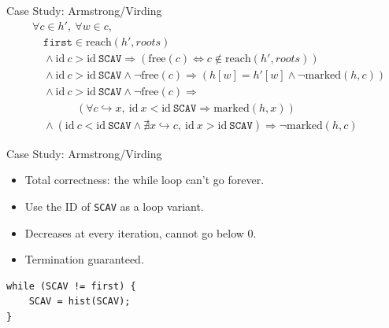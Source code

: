 \documentclass[usenames,dvipsnames]{beamer}
\renewcommand{\iff}{\Leftrightarrow}
\renewcommand{\implies}{\Rightarrow}
\newcommand{\pointsto}{\hookrightarrow}
\newcommand{\reach}[2]{\mathrm{reach}\left(#1, #2\right)}
\newcommand{\id}{\mathrm{id}}
\newcommand{\free}[1]{\mathrm{free}\left(#1\right)}
\newcommand{\marked}[2]{\mathrm{marked}\left(#1, #2\right)}
\begin{document}
\begin{frame}[fragile]{Case Study: Armstrong/Virding}
  \begin{align*}
    &\forall c \in h',\ \forall w \in c,\\
    &\quad\mathtt{first} \in\reach{h'}{roots}\\
%
    &\quad\land \id~c > \id~\mathtt{SCAV} \implies (\free{c}
      \iff c \notin \reach{h'}{roots})\\
%
    &\quad\land \id~c > \id~\mathtt{SCAV} \land \lnot\free{c}
      \implies (h[w] = h'[w] \land \lnot \marked{h}{c})\\
%
    &\quad\land \id~c > \id~\mathtt{SCAV} \land \lnot\free{c}
      \implies\\
      &\quad\quad\quad\quad(\forall c \pointsto x,\ \id~x <
      \id~\mathtt{SCAV} \implies \marked{h}{x})\\
%
    &\quad\land \left(\id~c < \id~\mathtt{SCAV} \land \nexists x \pointsto
      c,\ \id~x > \id~\mathtt{SCAV}\right) \implies \lnot\marked{h}{c}
  \end{align*}

\end{frame}

\begin{frame}[fragile]{Case Study: Armstrong/Virding}
  \begin{itemize}
  \item Total correctness: the while loop can't go forever.
  \item Use the ID of \texttt{SCAV} as a loop variant.
  \item Decreases at every iteration, cannot go below 0.
  \item Termination guaranteed.
  \end{itemize}

  \begin{lstlisting}
while (SCAV != first) {
    SCAV = hist(SCAV);
}
  \end{lstlisting}

\end{frame}
\end{document}
